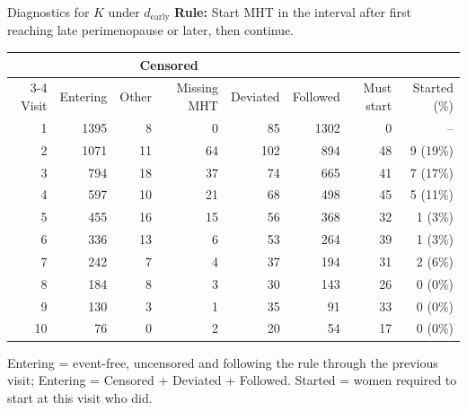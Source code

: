 \documentclass[11pt, xcolor={dvipsnames}, usepdftitle=false]{beamer}
\begin{document}
\begin{frame}{Diagnostics for $K$ under $d_\text{early}$}
\centering
{\small \textbf{Rule:} Start MHT in the interval after first reaching late perimenopause or later, then continue.}\par\vspace{6pt}
{\scriptsize
\begin{tabular}{r r r r r r r r}
\toprule
 & & \multicolumn{2}{c}{Censored} & & & & \\
\cmidrule(lr){3-4}
Visit & Entering & Other & Missing MHT & Deviated & Followed & Must start & Started (\%) \\
\midrule
1 & 1395 & 8 & 0 & 85 & 1302 & 0 & -- \\
2 & 1071 & 11 & 64 & 102 & 894 & 48 & 9 (19\%) \\
3 & 794 & 18 & 37 & 74 & 665 & 41 & 7 (17\%) \\
4 & 597 & 10 & 21 & 68 & 498 & 45 & 5 (11\%) \\
5 & 455 & 16 & 15 & 56 & 368 & 32 & 1 (3\%) \\
6 & 336 & 13 & 6 & 53 & 264 & 39 & 1 (3\%) \\
7 & 242 & 7 & 4 & 37 & 194 & 31 & 2 (6\%) \\
8 & 184 & 8 & 3 & 30 & 143 & 26 & 0 (0\%) \\
9 & 130 & 3 & 1 & 35 & 91 & 33 & 0 (0\%) \\
10 & 76 & 0 & 2 & 20 & 54 & 17 & 0 (0\%) \\
\bottomrule
\end{tabular}}
\par\vspace{6pt}
{\tiny Entering = event-free, uncensored and following the rule through the previous visit; Entering = Censored + Deviated + Followed. Started = women required to start at this visit who did.}
\end{frame}
\end{document}
